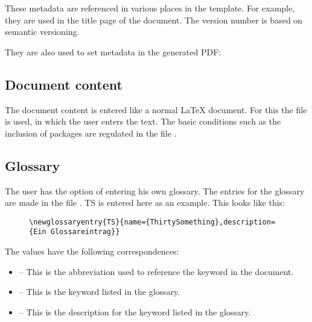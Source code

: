 These metadata are referenced in various places in the template. For example,
they are used in the title page of the document. The version number is based
on semantic versioning.


They are also used to set metadata in the generated PDF:


\subsection{Document content}

The document content is entered like a normal \LaTeX{} document. For this the
file  is used, in which the user enters the text.
The basic conditions such as the inclusion of packages are regulated in the file
.

\subsection{Glossary}

The user has the option of entering his own glossary. The entries for the
glossary are made in the file . \gls{TS}
is entered here as an example. This looks like this:

\begin{figure}[H]
    \scriptsize
    \centering
    \begin{BVerbatim}
\newglossaryentry{TS}{name={ThirtySomething},description={Ein Glossareintrag}}
    \end{BVerbatim}
\end{figure}

The values have the following correspondences:

\begin{itemize}
    \item {} -- This is the abbreviation used to reference the
          keyword in the document.
    \item {} -- This is the keyword listed in the
          glossary.
    \item {} -- This is the description for the
          keyword listed in the glossary.
\end{itemize}

